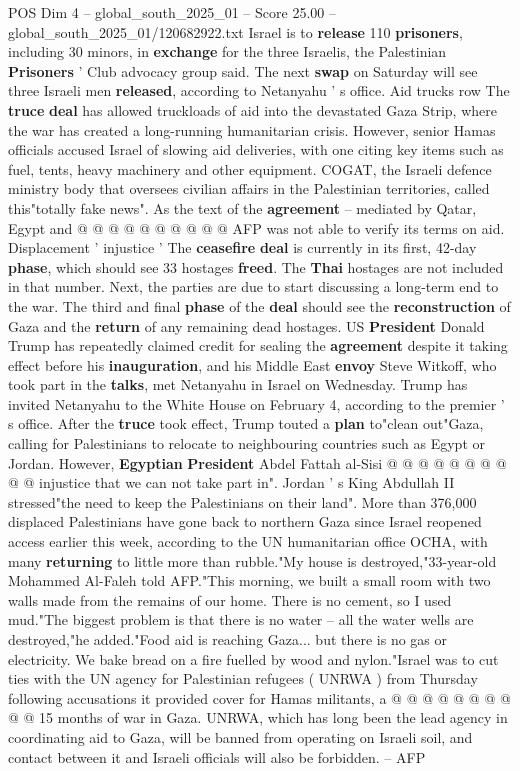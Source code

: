 \begin{textsample}{POS Dim 4 – global\_south\_2025\_01 – Score 25.00 – global\_south\_2025\_01/120682922.txt}
Israel is to \textbf{release} 110 \textbf{prisoners}, including 30 minors, in \textbf{exchange} for the three Israelis, the Palestinian \textbf{Prisoners} ' Club advocacy group said.
The next \textbf{swap} on Saturday will see three Israeli men \textbf{released}, according to Netanyahu ' s office.
Aid trucks row The \textbf{truce} \textbf{deal} has allowed truckloads of aid into the devastated Gaza Strip, where the war has created a long-running humanitarian crisis.
However, senior Hamas officials accused Israel of slowing aid deliveries, with one citing key items such as fuel, tents, heavy machinery and other equipment.
COGAT, the Israeli defence ministry body that oversees civilian affairs in the Palestinian territories, called this"totally fake news".
As the text of the \textbf{agreement} -- mediated by Qatar, Egypt and @ @ @ @ @ @ @ @ @ @ AFP was not able to verify its terms on aid.
Displacement ' injustice ' The \textbf{ceasefire} \textbf{deal} is currently in its first, 42-day \textbf{phase}, which should see 33 hostages \textbf{freed}.
The \textbf{Thai} hostages are not included in that number.
Next, the parties are due to start discussing a long-term end to the war.
The third and final \textbf{phase} of the \textbf{deal} should see the \textbf{reconstruction} of Gaza and the \textbf{return} of any remaining dead hostages.
US \textbf{President} Donald Trump has repeatedly claimed credit for sealing the \textbf{agreement} despite it taking effect before his \textbf{inauguration}, and his Middle East \textbf{envoy} Steve Witkoff, who took part in the \textbf{talks}, met Netanyahu in Israel on Wednesday.
Trump has invited Netanyahu to the White House on February 4, according to the premier ' s office.
After the \textbf{truce} took effect, Trump touted a \textbf{plan} to"clean out"Gaza, calling for Palestinians to relocate to neighbouring countries such as Egypt or Jordan.
However, \textbf{Egyptian} \textbf{President} Abdel Fattah al-Sisi @ @ @ @ @ @ @ @ @ @ injustice that we can not take part in".
Jordan ' s King Abdullah II stressed"the need to keep the Palestinians on their land".
More than 376,000 displaced Palestinians have gone back to northern Gaza since Israel reopened access earlier this week, according to the UN humanitarian office OCHA, with many \textbf{returning} to little more than rubble."My house is destroyed,"33-year-old Mohammed Al-Faleh told AFP."This morning, we built a small room with two walls made from the remains of our home.
There is no cement, so I used mud."The biggest problem is that there is no water -- all the water wells are destroyed,"he added."Food aid is reaching Gaza... but there is no gas or electricity.
We bake bread on a fire fuelled by wood and nylon."Israel was to cut ties with the UN agency for Palestinian refugees ( UNRWA ) from Thursday following accusations it provided cover for Hamas militants, a @ @ @ @ @ @ @ @ @ @ 15 months of war in Gaza.
UNRWA, which has long been the lead agency in coordinating aid to Gaza, will be banned from operating on Israeli soil, and contact between it and Israeli officials will also be forbidden. -- AFP


\end{textsample}
